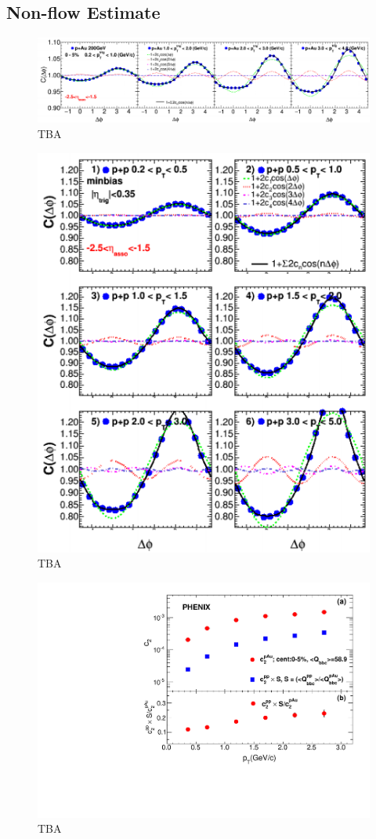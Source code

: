 \subsection{Non-flow Estimate}
\begin{figure}[!h]
\begin{center}
\includegraphics[width=0.6\linewidth]{figs/pau_correlation_central_fvtx.png}
\caption{TBA}
\end{center}
\end{figure}
\begin{figure}[!h]
\begin{center}
\includegraphics[width=0.6\linewidth]{figs/pp_correlation_minbias_fvtx.png}
\caption{TBA}
\end{center}
\end{figure}
\begin{figure}[!h]
\begin{center}
\includegraphics[width=0.6\linewidth]{figs/non_flow.pdf}
\caption{TBA}
\end{center}
\end{figure}
